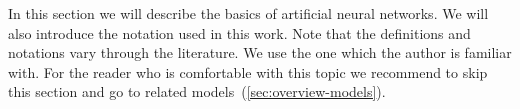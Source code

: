 
\newcommand{\argmin}{\operatornamewithlimits{arg\,min}}
\newcommand{\Bx}{{\bf x} }
\newcommand{\By}{{\bf y} }
\newcommand{\Bh}{{\bf h} }
\newcommand{\Bw}{{\bf w} }
\newcommand{\Bc}{{\bf c} }

In this section we will describe the basics of artificial neural networks. We will also introduce the notation used in this work. Note that the definitions and notations vary through the literature. We use the one which the author is familiar with. For the reader who is comfortable with this topic we recommend to skip this section and go to related models~(\ref{sec:overview-models}). 

 
\label{sec:perceptron} 



 

 
